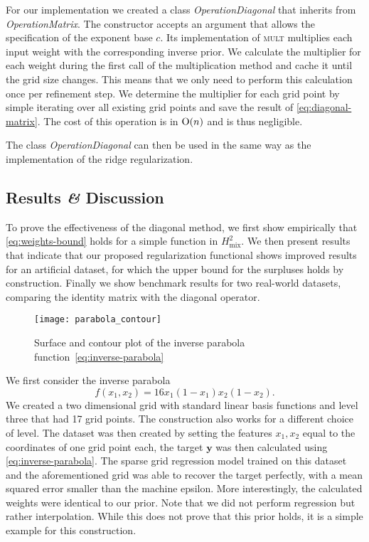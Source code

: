 For our implementation we created a class \emph{OperationDiagonal} that inherits
from \emph{OperationMatrix}.
The constructor accepts an argument that allows the specification of the
exponent base \(c\).
Its implementation of \textsc{mult} multiplies each input weight with the corresponding inverse prior.
We calculate the multiplier for each weight during the first call of the multiplication method and cache it until the grid size changes.
This means that we only need to perform this calculation once per refinement step.
We determine the multiplier for each grid point by simple iterating over all existing grid points and save the result of \cref{eq:diagonal-matrix}.
The cost of this operation is in \(\operatorname{O}(n)\) and is thus negligible.

The class \emph{OperationDiagonal} can then be used in the same way as the
implementation of the ridge regularization.

\subsection{Results \textit{\&} Discussion}\label{sec:tikh-discussion}
To prove the effectiveness of the diagonal method, we first show empirically that \cref{eq:weights-bound} holds for a simple function in \(H^2_{\text{mix}}\).
We then present results that indicate that our proposed regularization functional shows improved results for an artificial dataset, for which the upper bound for the surpluses holds by construction.
Finally we show benchmark results for two real-world datasets, comparing the identity matrix with the diagonal operator.

\begin{figure}[ht]
  \centering
    \texttt{[image: parabola\_contour]}
  \caption{Surface and contour plot of the inverse parabola function~\ref{eq:inverse-parabola}}
\end{figure}

We first consider the inverse parabola
\begin{equation}\label{eq:inverse-parabola}
  f(x_1, x_2) = 16x_1(1-x_1)x_2(1-x_2).
\end{equation}
We created a two dimensional grid with standard linear basis functions and level
three that had 17 grid points.
The construction also works for a different choice of level.
The dataset was then created by setting the features \(x_1, x_2\) equal to the coordinates of one grid point each, the target \(\bm{y}\) was then calculated using \cref{eq:inverse-parabola}.
The sparse grid regression model trained on this dataset and the aforementioned
grid was able to recover the target perfectly, with a mean squared error smaller
than the machine epsilon.
More interestingly, the calculated weights were identical to our prior.
Note that we did not perform regression but rather interpolation.
While this does not prove that this prior holds, it is a simple example for this construction.


